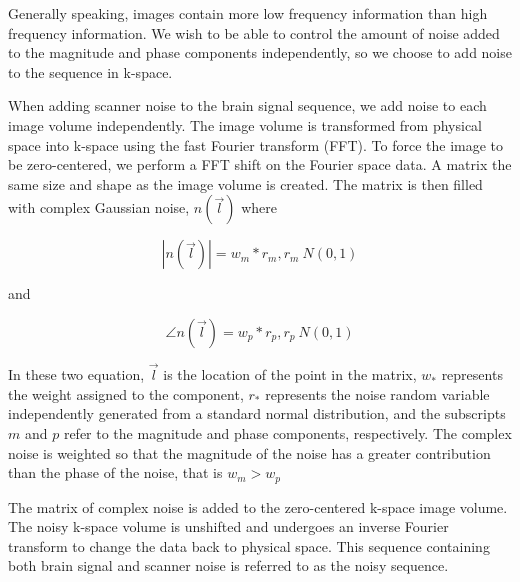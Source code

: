 
Generally speaking, images contain more low frequency information than high frequency information. We wish to be able to control the amount of noise added to the magnitude and phase components independently, so we choose to add noise to the sequence in k-space.

When adding scanner noise to the brain signal sequence, we add noise to each image volume independently. The image volume is transformed from physical space into k-space using the fast Fourier transform (FFT). To force the image to be zero-centered, we perform a FFT shift on the Fourier space data. A matrix the same size and shape as the image volume is created. The matrix is then filled with complex Gaussian noise, $n(\vec{l})$ where

\begin{equation}
|n(\vec{l})| = w_m * r_m, r_m~N(0,1)
\end{equation}

\noindent and

\begin{equation}
\angle n(\vec{l}) = w_p * r_p, r_p~N(0,1)
\end{equation}

\noindent In these two equation, $\vec{l}$ is the location of the point in the matrix, $w_*$ represents the weight assigned to the component, $r_*$ represents the noise random variable independently generated from a standard normal distribution, and the subscripts $m$ and $p$ refer to the magnitude and phase components, respectively. The complex noise is weighted so that the magnitude of the noise has a greater contribution than the phase of the noise, that is $w_m > w_p$ 

The matrix of complex noise is added to the zero-centered k-space image volume. The noisy k-space volume is unshifted and undergoes an inverse Fourier transform to change the data back to physical space. This sequence containing both brain signal and scanner noise is referred to as the noisy sequence.

